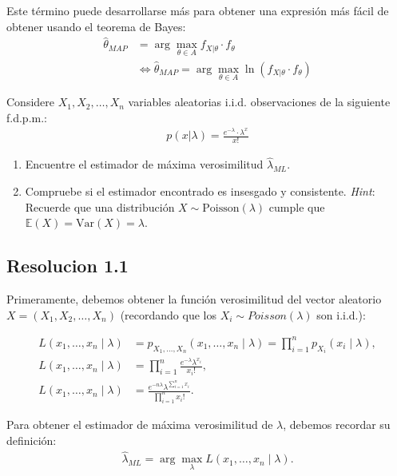 \documentclass[
  11pt,
  letterpaper,
   addpoints,
  ]{exam}
\begin{document}
Este término puede desarrollarse más para obtener una expresión más fácil de obtener usando el teorema de Bayes:
\begin{align}
\hat{\theta}_{MAP} &= \arg \max_{\theta \in A} f_{X|\theta} \cdot f_\theta \\
&\iff \hat{\theta}_{MAP} = \arg \max_{\theta \in A} \ln(f_{X|\theta} \cdot f_\theta)
\end{align}
\newpage
\begin{questions}
    \question 
    Considere $X_1, X_2, \dots, X_n$ variables aleatorias i.i.d. observaciones de la siguiente f.d.p.m.:
    \begin{align}
    p(x|\lambda) = \frac{e^{-\lambda} \cdot \lambda^x}{x!}
    \end{align}
    
    \begin{enumerate}
        \item Encuentre el estimador de máxima verosimilitud $\hat{\lambda}_{ML}$.
        \item Compruebe si el estimador encontrado es insesgado y consistente. \textit{Hint}: Recuerde que una distribución $X \sim \text{Poisson}(\lambda)$ cumple que $\mathbb{E}(X) = \text{Var}(X) = \lambda$.
    \end{enumerate}
      
    \begin{solution}
        \subsection*{Resolucion 1.1}
        Primeramente, debemos obtener la función verosimilitud del vector aleatorio \( X = (X_1, X_2, \ldots, X_n) \) (recordando que los \( X_i \sim Poisson(\lambda) \) son i.i.d.):

\begin{align}
L(x_1, \ldots, x_n \mid \lambda) 
    &= p_{X_1, \ldots, X_n}(x_1, \ldots, x_n \mid \lambda) 
    = \prod_{i=1}^n p_{X_i}(x_i \mid \lambda), \\
L(x_1, \ldots, x_n \mid \lambda) 
    &= \prod_{i=1}^n \frac{e^{-\lambda} \lambda^{x_i}}{x_i!}, \\
L(x_1, \ldots, x_n \mid \lambda) 
    &= \frac{e^{-n\lambda} \lambda^{\sum_{i=1}^n x_i}}{\prod_{i=1}^n x_i!}.
\end{align}

Para obtener el estimador de máxima verosimilitud de \(\lambda\), debemos recordar su definición:
\begin{align}
\hat{\lambda}_{ML} = \arg \max_{\lambda} L(x_1, \ldots, x_n \mid \lambda).
\end{align}


\end{solution}
\end{questions}
\end{document}
